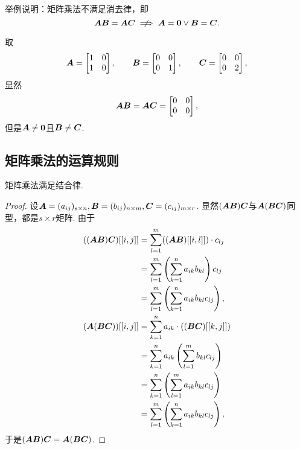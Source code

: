 \begin{example}
举例说明：矩阵乘法不满足消去律，即\begin{equation*}
	\vb{A} \vb{B} = \vb{A} \vb{C}
	\notimplies
	\vb{A} = \vb0 \lor \vb{B} = \vb{C}.
\end{equation*}
\begin{solution}
取\begin{equation*}
	\boldsymbol{A} = \begin{bmatrix}
		1 & 0 \\
		1 & 0
	\end{bmatrix},
	\qquad
	\boldsymbol{B} = \begin{bmatrix}
		0 & 0 \\
		0 & 1
	\end{bmatrix},
	\qquad
	\boldsymbol{C} = \begin{bmatrix}
		0 & 0 \\
		0 & 2
	\end{bmatrix},
\end{equation*}
显然\begin{equation*}
	\boldsymbol{A}\boldsymbol{B}
	= \boldsymbol{A}\boldsymbol{C}
	= \begin{bmatrix}
		0 & 0 \\
		0 & 0
	\end{bmatrix},
\end{equation*}
但是\(\boldsymbol{A}\neq\boldsymbol0\)且\(\boldsymbol{B}\neq\boldsymbol{C}\).
\end{solution}
\end{example}

\subsection{矩阵乘法的运算规则}
\begin{theorem}
矩阵乘法满足结合律.
\begin{proof}
设\(\boldsymbol{A} = (a_{ij})_{s \times n},
\boldsymbol{B} = (b_{ij})_{n \times m},
\boldsymbol{C} = (c_{ij})_{m \times r}\).
显然\((\boldsymbol{A}\boldsymbol{B})\boldsymbol{C}\)与\(\boldsymbol{A}(\boldsymbol{B}\boldsymbol{C})\)同型，都是\(s \times r\)矩阵.
由于\begin{align*}
	((\boldsymbol{A}\boldsymbol{B})\boldsymbol{C})[[i,j]]
	&= \sum_{l=1}^m ((\boldsymbol{A}\boldsymbol{B})[[i,l]]) \cdot c_{lj} \\
	&= \sum_{l=1}^m \left( \sum_{k=1}^n a_{ik} b_{kl} \right) c_{lj} \\
	&= \sum_{l=1}^m \left( \sum_{k=1}^n a_{ik} b_{kl} c_{lj} \right), \\
	(\boldsymbol{A}(\boldsymbol{B}\boldsymbol{C}))[[i,j]]
	&= \sum_{k=1}^n a_{ik} \cdot ((\boldsymbol{B}\boldsymbol{C})[[k,j]]) \\
	&= \sum_{k=1}^n a_{ik} \left( \sum_{l=1}^m b_{kl} c_{lj} \right) \\
	&= \sum_{k=1}^n \left( \sum_{l=1}^m a_{ik} b_{kl} c_{lj} \right) \\
	&= \sum_{l=1}^m \left( \sum_{k=1}^n a_{ik} b_{kl} c_{lj} \right),
\end{align*}
于是\((\boldsymbol{A}\boldsymbol{B})\boldsymbol{C} = \boldsymbol{A}(\boldsymbol{B}\boldsymbol{C})\).
\end{proof}
\end{theorem}

